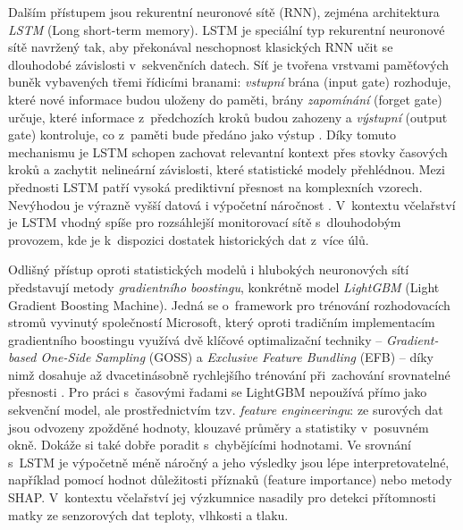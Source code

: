 Dalším přístupem jsou rekurentní neuronové sítě (RNN), zejména architektura \textit{LSTM} (Long short-term memory). LSTM je speciální typ rekurentní neuronové sítě navržený tak, aby překonával neschopnost klasických RNN učit se dlouhodobé závislosti v~sekvenčních datech. Síť je tvořena vrstvami paměťových buněk vybavených třemi řídicími branami: \textit{vstupní} brána (input gate) rozhoduje, které nové informace budou uloženy do paměti, brány \textit{zapomínání} (forget gate) určuje, které informace z~předchozích kroků budou zahozeny a \textit{výstupní} (output gate) kontroluje, co z~paměti bude předáno jako výstup \cite{Gers2000}. Díky tomuto mechanismu je LSTM schopen zachovat relevantní kontext přes stovky časových kroků a zachytit nelineární závislosti, které statistické modely přehlédnou. Mezi přednosti LSTM patří vysoká prediktivní přesnost na komplexních vzorech. Nevýhodou je výrazně vyšší datová  i výpočetní náročnost \cite{Yadav2022}. V~kontextu včelařství je LSTM vhodný spíše pro rozsáhlejší monitorovací sítě s~dlouhodobým provozem, kde je k~dispozici dostatek historických dat z~více úlů.

Odlišný přístup oproti statistických modelů i hlubokých neuronových sítí představují metody \textit{gradientního boostingu}, konkrétně model \textit{LightGBM} (Light Gradient Boosting Machine). Jedná se o~framework pro trénování rozhodovacích stromů vyvinutý společností Microsoft, který oproti tradičním implementacím gradientního boostingu využívá dvě klíčové optimalizační techniky -- \textit{Gradient-based One-Side Sampling} (GOSS) a \textit{Exclusive Feature Bundling} (EFB) -- díky nimž dosahuje až dvacetinásobně rychlejšího trénování při~zachování srovnatelné přesnosti \cite{Ke2017}. Pro práci s~časovými řadami se LightGBM nepoužívá přímo jako sekvenční model, ale prostřednictvím tzv. \textit{feature engineeringu}: ze surových dat jsou odvozeny zpožděné hodnoty, klouzavé průměry a statistiky v~posuvném okně. Dokáže si také dobře poradit s~chybějícími hodnotami. Ve srovnání s~LSTM je výpočetně méně náročný a jeho výsledky jsou lépe interpretovatelné, například pomocí hodnot důležitosti příznaků (feature importance) nebo metody SHAP. V~kontextu včelařství jej výzkumnice \cite{Luca2025} nasadily pro detekci přítomnosti matky ze senzorových dat teploty, vlhkosti a tlaku.

